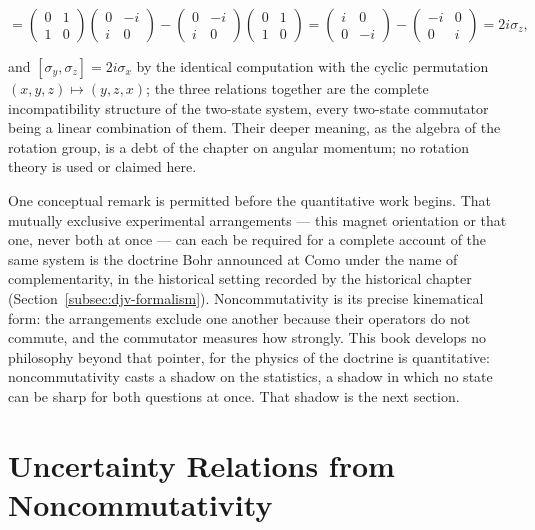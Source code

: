 \begin{linenomath}
\begin{equation}
    [\sigma_x,\sigma_y]
    = \begin{pmatrix}0&1\\1&0\end{pmatrix}\!\begin{pmatrix}0&-i\\i&0\end{pmatrix}
      -\begin{pmatrix}0&-i\\i&0\end{pmatrix}\!\begin{pmatrix}0&1\\1&0\end{pmatrix}
    = \begin{pmatrix}i&0\\0&-i\end{pmatrix} - \begin{pmatrix}-i&0\\0&i\end{pmatrix}
    = 2i\sigma_z,
\end{equation}
\end{linenomath}
and $[\sigma_y,\sigma_z]=2i\sigma_x$ by the identical computation with the cyclic permutation $(x,y,z)\mapsto(y,z,x)$; the three relations together are the complete incompatibility structure of the two-state system, every two-state commutator being a linear combination of them. Their deeper meaning, as the algebra of the rotation group, is a debt of the chapter on angular momentum; no rotation theory is used or claimed here.

One conceptual remark is permitted before the quantitative work begins. That mutually exclusive experimental arrangements --- this magnet orientation or that one, never both at once --- can each be required for a complete account of the same system is the doctrine Bohr announced at Como under the name of complementarity, in the historical setting recorded by the historical chapter (Section~\ref{subsec:djv-formalism}). Noncommutativity is its precise kinematical form: the arrangements exclude one another because their operators do not commute, and the commutator measures how strongly. This book develops no philosophy beyond that pointer, for the physics of the doctrine is quantitative: noncommutativity casts a shadow on the statistics, a shadow in which no state can be sharp for both questions at once. That shadow is the next section.

\section{Uncertainty Relations from Noncommutativity}
\label{sec:uncertainty}

